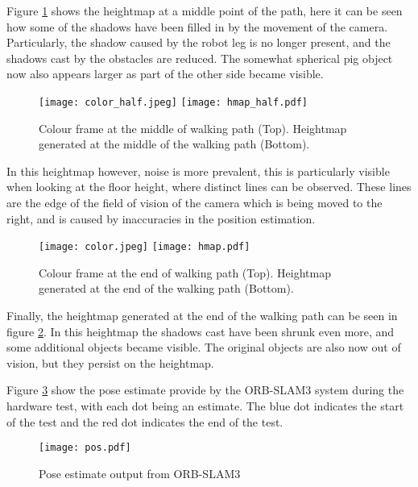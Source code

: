         \newpage
        \noindent
        Figure \ref{fig:hardware_hmap_mid} shows the heightmap at a middle point of the path, here it can be seen how some of the shadows have been
        filled in by the movement of the camera. Particularly, the shadow caused by the robot leg is no longer present, and the shadows cast by the
        obstacles are reduced. The somewhat spherical pig object now also appears larger as part of the other side became visible.
        \begin{figure}[h]
            \centering
            \hspace{-0.8cm}
            \texttt{[image: color\_half.jpeg]}
            \texttt{[image: hmap\_half.pdf]}
            \caption{Colour frame at the middle of walking path (Top). Heightmap generated at the middle of the walking path (Bottom).}
            \label{fig:hardware_hmap_mid}
        \end{figure}

        \noindent
        In this heightmap however, noise is more prevalent, this is particularly visible when looking at the floor height, where distinct lines can be observed.
        These lines are the edge of the field of vision of the camera which is being moved to the right, and is caused by inaccuracies in the position estimation.

        \begin{figure}[h]
            \centering
            \hspace{-0.8cm}
            \texttt{[image: color.jpeg]}
            \texttt{[image: hmap.pdf]}
            \caption{Colour frame at the end of walking path (Top). Heightmap generated at the end of the walking path (Bottom).}
            \label{fig:hardware_hmap}
        \end{figure}

        \noindent
        Finally, the heightmap generated at the end of the walking path can be seen in figure \ref{fig:hardware_hmap}. In this heightmap the shadows cast have been shrunk even more, and some additional objects became visible. The original objects are also now out of vision, but they persist on the heightmap. 

        Figure \ref{fig:hardware_pos}  show the pose estimate provide by the ORB-SLAM3 system during the hardware test, with each dot being an estimate. The blue dot indicates the start of the test and the red dot indicates the end of the test.
        \begin{figure}[h]
            \centering
            \texttt{[image: pos.pdf]}
            \caption{Pose estimate output from ORB-SLAM3}
            \label{fig:hardware_pos}
        \end{figure}

